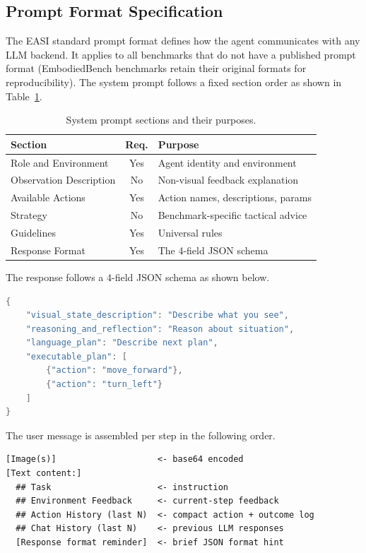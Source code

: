 \documentclass[
hf,
]{confart}
\begin{document}
\subsection{Prompt Format Specification}

The EASI standard prompt format defines how the agent communicates with any LLM backend. It applies to all benchmarks that do not have a published prompt format (EmbodiedBench benchmarks retain their original formats for reproducibility). The system prompt follows a fixed section order as shown in Table~\ref{tab:prompt_sections}.

\begin{table}[htbp]
\centering
\caption{System prompt sections and their purposes.}
\label{tab:prompt_sections}
\small
\renewcommand{\arraystretch}{1.1}
\begin{tabular}{lcp{5cm}}
\toprule
\textbf{Section} & \textbf{Req.} & \textbf{Purpose} \\
\midrule
Role and Environment & Yes & Agent identity and environment \\
Observation Description & No & Non-visual feedback explanation \\
Available Actions & Yes & Action names, descriptions, params \\
Strategy & No & Benchmark-specific tactical advice \\
Guidelines & Yes & Universal rules \\
Response Format & Yes & The 4-field JSON schema \\
\bottomrule
\end{tabular}
\end{table}

The response follows a 4-field JSON schema as shown below.
\begin{lstlisting}[language=Java, basicstyle=\ttfamily\small, numbers=none]
{
    "visual_state_description": "Describe what you see",
    "reasoning_and_reflection": "Reason about situation",
    "language_plan": "Describe next plan",
    "executable_plan": [
        {"action": "move_forward"},
        {"action": "turn_left"}
    ]
}
\end{lstlisting}

The user message is assembled per step in the following order.
\begin{lstlisting}[basicstyle=\ttfamily\small, numbers=none, backgroundcolor=\color{white}, frame=single]
[Image(s)]                    <- base64 encoded
[Text content:]
  ## Task                     <- instruction
  ## Environment Feedback     <- current-step feedback
  ## Action History (last N)  <- compact action + outcome log
  ## Chat History (last N)    <- previous LLM responses
  [Response format reminder]  <- brief JSON format hint
\end{lstlisting}
\end{document}
